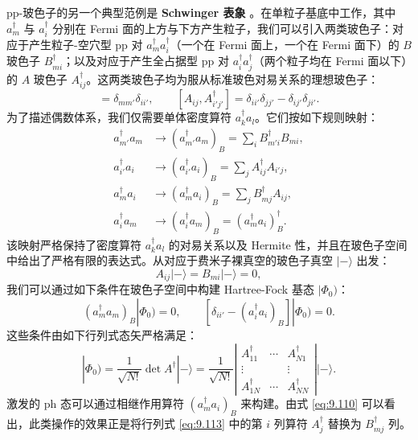 pp-玻色子的另一个典型范例是 \textbf{Schwinger 表象} \cite{BM78}。在单粒子基底中工作，其中 $a^{\dagger}_{m}$
与 $a^{\dagger}_{i}$ 分别在 Fermi 面的上方与下方产生粒子，我们可以引入两类玻色子：对应于产生粒子-空穴型
pp 对 $a^{\dagger}_{m}a^{\dagger}_{i}$（一个在 Fermi 面上，一个在 Fermi 面下）的
$B$ 玻色子 $B^{\dagger}_{mi}$；以及对应于产生全占据型 pp 对 $a^{\dagger}_{i}a^{\dagger}_{j}$（两个粒子均在
Fermi 面以下）的 $A$ 玻色子 $A^{\dagger}_{ij}$。这两类玻色子均为服从标准玻色对易关系的理想玻色子：
\begin{equation}
[B_{mi},B^{\dagger}_{m'i'}]=\delta_{mm'}\delta_{ii'},\qquad[A_{ij},A^{\dagger}_{i'j'}]=\delta_{ii'}\delta_{jj'}-\delta_{ij'}\delta_{ji'}.\label{eq:9.109}
\end{equation}
为了描述偶数体系，我们仅需要单体密度算符 $a^{\dagger}_{k}a_{l}$。它们按如下规则映射：
\begin{align}
a^{\dagger}_{m'}a_{m} & \to(a^{\dagger}_{m'}a_{m})_{B}=\sum_{i}B^{\dagger}_{m'i}B_{mi},\nonumber \\
a^{\dagger}_{i'}a_{i} & \to(a^{\dagger}_{i'}a_{i})_{B}=\sum_{j}A^{\dagger}_{ij}A_{i'j},\label{eq:9.110}\\
a^{\dagger}_{m}a_{i} & \to(a^{\dagger}_{m}a_{i})_{B}=\sum_{j}B^{\dagger}_{mj}A_{ij},\nonumber \\
a^{\dagger}_{i}a_{m} & \to(a^{\dagger}_{i}a_{m})_{B}=(a^{\dagger}_{m}a_{i})^{\dagger}_{B}.\nonumber 
\end{align}
该映射严格保持了密度算符 $a^{\dagger}_{k}a_{l}$ 的对易关系以及 Hermite 性，并且在玻色子空间中给出了严格有限的表达式。从对应于费米子裸真空的玻色子真空
$|-\rangle$ 出发：
\begin{equation}
A_{ij}|-\rangle=B_{mi}|-\rangle=0,\label{eq:9.111}
\end{equation}
我们可以通过如下条件在玻色子空间中构建 Hartree-Fock 基态 $|\Phi_{0})$：
\begin{equation}
(a^{\dagger}_{m}a_{m})_{B}|\Phi_{0})=0,\qquad[\delta_{ii'}-(a^{\dagger}_{i}a_{i})_{B}]|\Phi_{0})=0.\label{eq:9.112}
\end{equation}
这些条件由如下行列式态矢严格满足：
\begin{equation}
|\Phi_{0})=\frac{1}{\sqrt{N!}}\det A^{\dagger}|-\rangle=\frac{1}{\sqrt{N!}}\left|\begin{matrix}A^{\dagger}_{11} & \cdots & A^{\dagger}_{N1}\\
\vdots &  & \vdots\\
A^{\dagger}_{1N} & \cdots & A^{\dagger}_{NN}
\end{matrix}\right||-\rangle.\label{eq:9.113}
\end{equation}
激发的 ph 态可以通过相继作用算符 $(a^{\dagger}_{m}a_{i})_{B}$ 来构建。由式 \ref{eq:9.110}
可以看出，此类操作的效果正是将行列式 \ref{eq:9.113} 中的第 $i$ 列算符 $A^{\dagger}_{j}$
替换为 $B^{\dagger}_{mj}$ 列。

